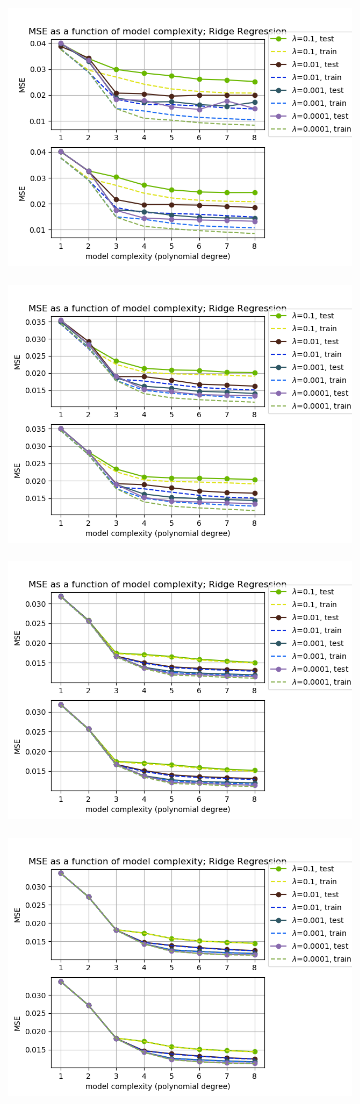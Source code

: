 \begin{figure}[!ht]
\begin{subfigure}{\textwidth}
  \centering
  \includegraphics[width=0.55\linewidth]{images/mse/fake_ridge_mse_p08_n10.png}
\end{subfigure}
\begin{subfigure}{\textwidth}
  \centering
  \includegraphics[width=0.55\linewidth]{images/mse/fake_ridge_mse_p08_n21.png}
\end{subfigure}
\begin{subfigure}{\textwidth}
  \centering
  \includegraphics[width=0.55\linewidth]{images/mse/fake_ridge_mse_p08_n50.png}
\end{subfigure}
\begin{subfigure}{\textwidth}
  \centering
  \includegraphics[width=0.55\linewidth]{images/mse/fake_ridge_mse_p08_n100.png}

\end{subfigure}
\end{figure}
